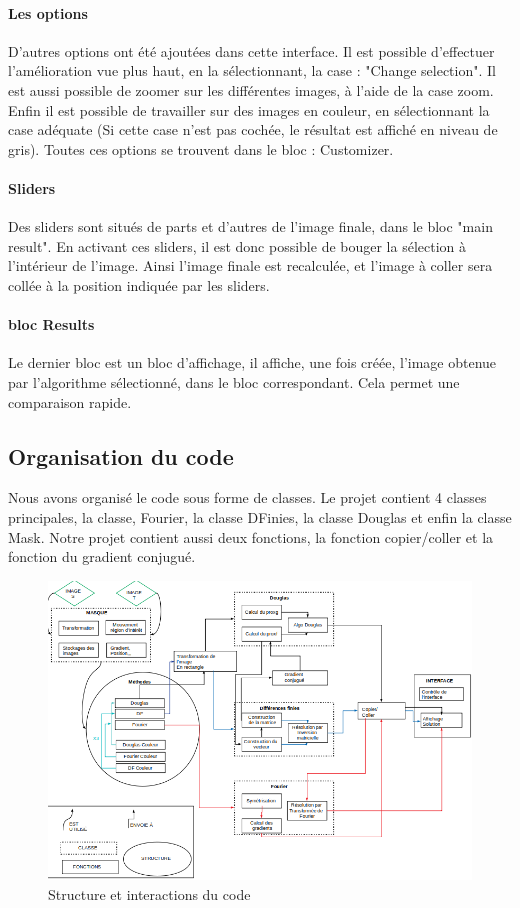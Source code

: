 \paragraph{Les options}
D'autres options ont été ajoutées dans cette interface. Il est possible d'effectuer l'amélioration vue plus haut, en la sélectionnant, la case : "Change selection". Il est aussi possible de zoomer sur les différentes images, à l'aide de la case zoom. Enfin il est possible de travailler sur des images en couleur, en sélectionnant la case adéquate (Si cette case n'est pas cochée, le résultat est affiché en niveau de gris). Toutes ces options se trouvent dans le bloc : Customizer.
\paragraph{Sliders}
Des sliders sont situés de parts et d'autres de l'image finale, dans le bloc "main result". En activant ces sliders, il est donc possible de bouger la sélection à l'intérieur de l'image. Ainsi l'image finale est recalculée, et l'image à coller sera collée à la position indiquée par les sliders.
\paragraph{bloc Results}
Le dernier bloc est un bloc d'affichage, il affiche, une fois créée, l'image obtenue par l'algorithme sélectionné, dans le bloc correspondant. Cela permet une comparaison rapide.
\subsection{Organisation du code}
Nous avons organisé le code sous forme de classes. Le projet contient 4 classes principales, la classe, Fourier, la classe DFinies, la classe Douglas et enfin la classe  Mask. Notre projet contient aussi deux fonctions, la fonction copier/coller et la fonction du gradient conjugué.


\begin{figure}[!h]
\includegraphics[scale=0.65]{Images/code/schema.png}
\caption{Structure et interactions du code}
\end{figure}
\newpage

